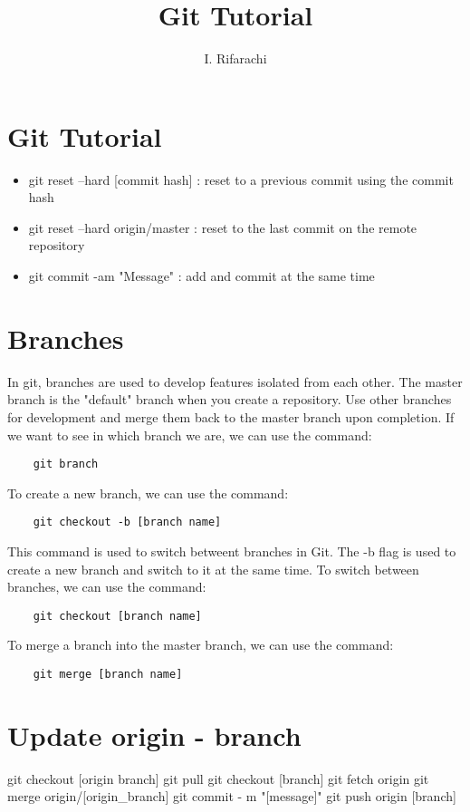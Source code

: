 \documentclass[12pt]{article}
\title{Git Tutorial}
\author{I. Rifarachi}
\begin{document}
\maketitle

\section{Git Tutorial}

\begin{itemize}
    \item git reset --hard [commit hash] : reset to a previous commit using the commit hash
    \item git reset --hard origin/master : reset to the last commit on the remote repository
    \item git commit -am "Message" : add and commit at the same time

\end{itemize}

\section{Branches}

In git, branches are used to develop features isolated from each other. The master branch is the "default" branch when you create a repository. Use other branches for development and merge them back to the master branch upon completion.
If we want to see in which branch we are, we can use the command:
\begin{verbatim}
    git branch
\end{verbatim}
To create a new branch, we can use the command:
\begin{verbatim}
    git checkout -b [branch name]
\end{verbatim}
This command is used to switch betweent branches in Git.
The -b flag is used to create a new branch and switch to it at the same time.
To switch between branches, we can use the command:
\begin{verbatim}
    git checkout [branch name]
\end{verbatim}
To merge a branch into the master branch, we can use the command:
\begin{verbatim}
    git merge [branch name]
\end{verbatim}

\section{Update origin - branch}
git checkout [origin branch]
git pull
git checkout [branch]
git fetch origin
git merge origin/[origin_branch]
git commit - m "[message]"
git push origin [branch]
\end{document}
